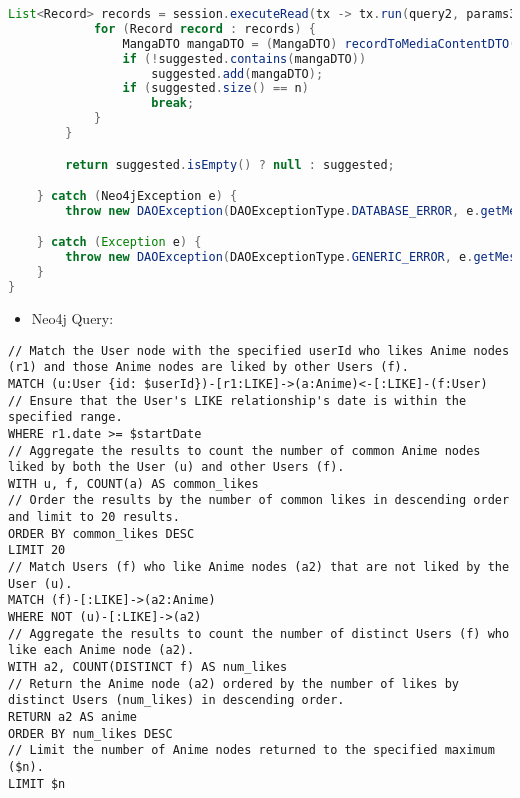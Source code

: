 \begin{mdframed}[style=customstyle]
\begin{lstlisting}[language=java]
            List<Record> records = session.executeRead(tx -> tx.run(query2, params3).list());
            for (Record record : records) {
                MangaDTO mangaDTO = (MangaDTO) recordToMediaContentDTO(record);
                if (!suggested.contains(mangaDTO))
                    suggested.add(mangaDTO);
                if (suggested.size() == n)
                    break;
            }
        }

        return suggested.isEmpty() ? null : suggested;

    } catch (Neo4jException e) {
        throw new DAOException(DAOExceptionType.DATABASE_ERROR, e.getMessage());

    } catch (Exception e) {
        throw new DAOException(DAOExceptionType.GENERIC_ERROR, e.getMessage());
    }
}\end{lstlisting}
\end{mdframed}

\begin{itemize}
    \item Neo4j Query:
\end{itemize}

\begin{mdframed}[style=customstyle]
\begin{lstlisting}[language=Cypher]
// Match the User node with the specified userId who likes Anime nodes (r1) and those Anime nodes are liked by other Users (f).
MATCH (u:User {id: $userId})-[r1:LIKE]->(a:Anime)<-[:LIKE]-(f:User)
// Ensure that the User's LIKE relationship's date is within the specified range.
WHERE r1.date >= $startDate
// Aggregate the results to count the number of common Anime nodes liked by both the User (u) and other Users (f).
WITH u, f, COUNT(a) AS common_likes
// Order the results by the number of common likes in descending order and limit to 20 results.
ORDER BY common_likes DESC
LIMIT 20
// Match Users (f) who like Anime nodes (a2) that are not liked by the User (u).
MATCH (f)-[:LIKE]->(a2:Anime)
WHERE NOT (u)-[:LIKE]->(a2)
// Aggregate the results to count the number of distinct Users (f) who like each Anime node (a2).
WITH a2, COUNT(DISTINCT f) AS num_likes
// Return the Anime node (a2) ordered by the number of likes by distinct Users (num_likes) in descending order.
RETURN a2 AS anime
ORDER BY num_likes DESC
// Limit the number of Anime nodes returned to the specified maximum ($n).
LIMIT $n\end{lstlisting}
\end{mdframed}